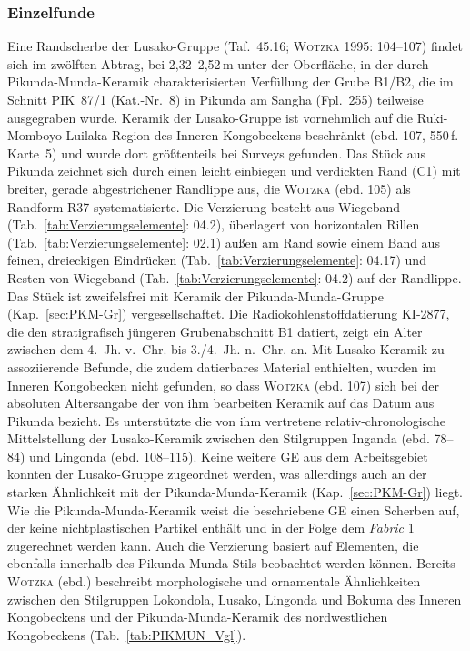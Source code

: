 \subsubsection{Einzelfunde}\label{sec:LUS-Gr}

Eine Randscherbe der Lusako-Gruppe (Taf.~45.16; \textsc{Wotzka} 1995: 104--107) findet sich im zwölften Abtrag, bei 2,32--2,52\,m unter der Oberfläche, in der durch Pikunda-Munda-Keramik charakterisierten Verfüllung der Grube B1/B2, die im Schnitt PIK~87/1 (Kat.-Nr.~8) in Pikunda am \mbox{Sangha} (Fpl.~255) teilweise ausgegraben wurde. Keramik der Lusako-Gruppe ist vornehmlich auf die Ruki-Momboyo-Luilaka-Region des Inneren Kongobeckens beschränkt (ebd. 107, 550\,f. Karte~5) und wurde dort größtenteils bei Surveys gefunden. Das Stück aus Pikunda zeichnet sich durch einen leicht einbiegen und verdickten Rand (C1) mit breiter, gerade abgestrichener Randlippe aus, die \textsc{Wotzka} (ebd. 105) als Randform R37 systematisierte. Die Verzierung besteht aus Wiegeband (Tab.~\ref{tab:Verzierungselemente}: 04.2), überlagert von horizontalen Rillen (Tab.~\ref{tab:Verzierungselemente}: 02.1) außen am Rand sowie einem Band aus feinen, dreieckigen Eindrücken (Tab.~\ref{tab:Verzierungselemente}: 04.17) und Resten von Wiegeband (Tab.~\ref{tab:Verzierungselemente}: 04.2) auf der Randlippe. Das Stück ist zweifelsfrei mit Keramik der Pikunda-Munda-Gruppe (Kap.~\ref{sec:PKM-Gr}) vergesellschaftet. Die Radiokohlenstoffdatierung KI-2877, die den stratigrafisch jüngeren Grubenabschnitt B1 datiert, zeigt ein Alter zwischen dem 4.~Jh. v.~Chr. bis 3./4.~Jh. n.~Chr. an. Mit Lusako-Keramik zu assoziierende Befunde, die zudem datierbares Material enthielten, wurden im Inneren Kongobecken nicht gefunden, so dass \textsc{Wotzka} (ebd. 107) sich bei der absoluten Altersangabe der von ihm bearbeiten Keramik auf das Datum aus Pikunda bezieht. Es unterstützte die von ihm vertretene relativ-chronologische Mittelstellung der Lusako-Keramik zwischen den Stilgruppen Inganda (ebd. 78--84) und Lingonda (ebd. 108--115). Keine weitere GE aus dem Arbeitsgebiet konnten der Lusako-Gruppe zugeordnet werden, was allerdings auch an der starken Ähnlichkeit mit der Pikunda-Munda-Keramik (Kap.~\ref{sec:PKM-Gr}) liegt. Wie die Pikunda-Munda-Keramik weist die beschriebene GE einen Scherben auf, der keine nichtplastischen Partikel enthält und in der Folge dem \textit{Fabric} 1 zugerechnet werden kann. Auch die Verzierung basiert auf Elementen, die ebenfalls innerhalb des Pikunda-Munda-Stils beobachtet werden können. Bereits \textsc{Wotzka} (ebd.) beschreibt morphologische und ornamentale Ähnlichkeiten zwischen den Stilgruppen Lokondola, Lusako, Lingonda und Bokuma des Inneren Kongobeckens und der Pikunda-Munda-Keramik des nordwestlichen Kongobeckens (Tab.~\ref{tab:PIKMUN_Vgl}).
